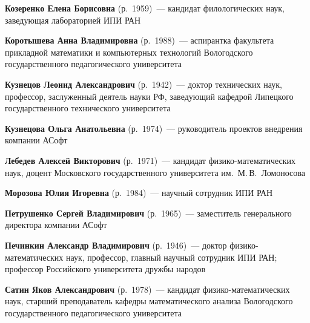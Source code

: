 \begin{multicols}{2}
\vspace*{2pt}

\noindent
\textbf{Козеренко Елена Борисовна} (р.\ 1959)~--- кандидат 
филологических наук, заведующая лабораторией ИПИ РАН

\vspace*{2pt}

\noindent
\textbf{Коротышева Анна Владимировна} (р.\ 1988)~--- аспирантка факультета
прикладной математики и компьютерных технологий Вологодского
государственного педагогического университета

\vspace*{2pt} 

\noindent
\textbf{Кузнецов Леонид Александрович} (р.\ 1942)~--- 
доктор технических наук, профессор,  заслуженный деятель 
науки РФ, заведующий кафедрой Липецкого государственного технического университета 

\vspace*{2pt} 

\noindent
\textbf{Кузнецова Ольга Анатольевна} (р.\ 1974)~--- руководитель проектов внедрения компании 
АСофт

\vspace*{2pt} 

\noindent
\textbf{Лебедев Алексей Викторович} (р.\ 1971)~--- кандидат фи\-зи\-ко-ма\-те\-ма\-ти\-че\-ских 
наук, доцент Московского государственного университета им.\ М.\,В.~Ломоносова
\columnbreak


\noindent
\textbf{Морозова Юлия Игоревна} (р.\ 1984)~--- научный сотрудник ИПИ РАН

\vspace*{5pt} 

\noindent
\textbf{Петрушенко Сергей Владимирович} (р.\ 1965)~--- за\-мес\-ти\-тель генерального 
директора компании АСофт

\vspace*{5pt}

\noindent
\textbf{Печинкин Александр Владимирович} (р.\ 1946)~--- доктор физико-математических наук,
профессор, главный научный сотрудник ИПИ РАН; профессор Российского университета
дружбы народов 

\vspace*{5pt}

\noindent
\textbf{Сатин Яков Александрович} (р.\ 1978)~--- кандидат
фи\-зи\-ко-математических наук, старший преподаватель кафедры
математического анализа Вологодского государственного
педагогического университета


\end{multicols}
